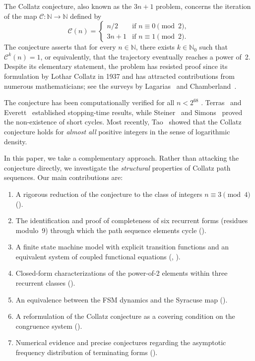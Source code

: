 \documentclass[11pt,a4paper]{article}
\theoremstyle{plain}
\theoremstyle{definition}
\newcommand{\N}{\mathbb{N}}
\newcommand{\Cmap}{\mathcal{C}}
\begin{document}
The Collatz conjecture, also known as the $3n+1$ problem, concerns the iteration of the map $\Cmap: \N \to \N$ defined by
\begin{equation}\label{eq:collatz}
  \Cmap(n) = \begin{cases}
    n/2 & \text{if } n \equiv 0 \pmod{2}, \\
    3n+1 & \text{if } n \equiv 1 \pmod{2}.
  \end{cases}
\end{equation}
The conjecture asserts that for every $n \in \N$, there exists $k \in \N_0$ such that $\Cmap^k(n) = 1$, or equivalently, that the trajectory eventually reaches a power of~2. Despite its elementary statement, the problem has resisted proof since its formulation by Lothar Collatz in 1937 and has attracted contributions from numerous mathematicians; see the surveys by Lagarias~\cite{lagarias1985,lagarias2010} and Chamberland~\cite{chamberland2003}.

The conjecture has been computationally verified for all $n < 2^{68}$ \cite{barina2020}. Terras~\cite{terras1976} and Everett~\cite{everett1977} established stopping-time results, while Steiner~\cite{steiner1977} and Simons~\cite{simons2007} proved the non-existence of short cycles. Most recently, Tao~\cite{tao2022} showed that the Collatz conjecture holds for \emph{almost all} positive integers in the sense of logarithmic density.

In this paper, we take a complementary approach. Rather than attacking the conjecture directly, we investigate the \emph{structural} properties of Collatz path sequences. Our main contributions are:

\begin{enumerate}[label=(\roman*)]
  \item A rigorous reduction of the conjecture to the class of integers $n \equiv 3 \pmod{4}$ ().
  \item The identification and proof of completeness of six recurrent forms (residues modulo~9) through which the path sequence elements cycle ().
  \item A finite state machine model with explicit transition functions and an equivalent system of coupled functional equations (, ).
  \item Closed-form characterizations of the power-of-2 elements within three recurrent classes ().
  \item An equivalence between the FSM dynamics and the Syracuse map ().
  \item A reformulation of the Collatz conjecture as a covering condition on the congruence system ().
  \item Numerical evidence and precise conjectures regarding the asymptotic frequency distribution of terminating forms ().
\end{enumerate}
\end{document}
